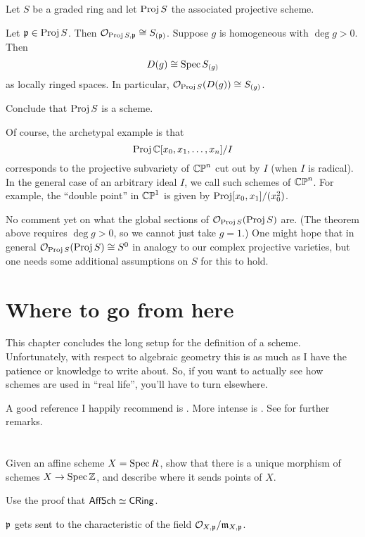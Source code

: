 \begin{theorem}
	Let $S$ be a graded ring and let $\operatorname{Proj} S$ the associated projective scheme.
	\begin{enumerate}[(a)]
		\ii Let $\mathfrak p \in \operatorname{Proj} S$.
		Then $\mathcal O_{\operatorname{Proj} S, \mathfrak p} \cong S_{(\mathfrak p)}$.
		\ii Suppose $g$ is homogeneous with $\deg g > 0$. Then
		\[ D(g) \cong \operatorname{Spec} S_{(g)} \]
		as locally ringed spaces.
		In particular, $\mathcal O_{\operatorname{Proj} S}(D(g)) \cong S_{(g)}$.
	\end{enumerate}
\end{theorem}
\begin{ques}
	Conclude that $\operatorname{Proj} S$ is a scheme.
\end{ques}

Of course, the archetypal example is that
\[ \operatorname{Proj} \mathbb C[x_0, x_1, \dots, x_n] / I \]
corresponds to the projective subvariety of $\mathbb{CP}^n$
cut out by $I$ (when $I$ is radical).
In the general case of an arbitrary ideal $I$, we
call such schemes  of $\mathbb{CP}^n$.
For example, the ``double point'' in  $\mathbb{CP}^1$
is given by $\operatorname{Proj}[x_0,x_1]/(x_0^2)$.

\begin{remark}
	No comment yet on what the global sections of $\mathcal O_{\operatorname{Proj} S}(\operatorname{Proj} S)$ are.
	(The theorem above requires $\deg g > 0$, so we cannot just take $g=1$.)
	One might hope that in general $\mathcal O_{\operatorname{Proj} S}(\operatorname{Proj} S) \cong S^0$
	in analogy to our complex projective varieties, but
	one needs some additional assumptions on $S$ for this to hold.
\end{remark}


\section{Where to go from here}
This chapter concludes the long setup for the definition of a scheme.
Unfortunately, with respect to algebraic geometry this is as much as I have
the patience or knowledge to write about.
So, if you want to actually see how schemes are used in ``real life'',
you'll have to turn elsewhere.

A good reference I happily recommend is \cite{ref:gathmann}.
More intense is \cite{ref:vakil}.
See  for further remarks.


\section{\problemhead}

\begin{problem}
	Given an affine scheme $X = \operatorname{Spec} R$,
	show that there is a unique morphism of schemes $X \to \operatorname{Spec} \mathbb Z$,
	and describe where it sends points of $X$.
	\begin{hint}
		Use the proof that $\mathsf{AffSch} \simeq \mathsf{CRing}$.
	\end{hint}
	\begin{sol}
		$\mathfrak p$ gets sent to the characteristic of the field $\mathcal O_{X,\mathfrak p} / \mathfrak m_{X,\mathfrak p}$.
	\end{sol}
\end{problem}


